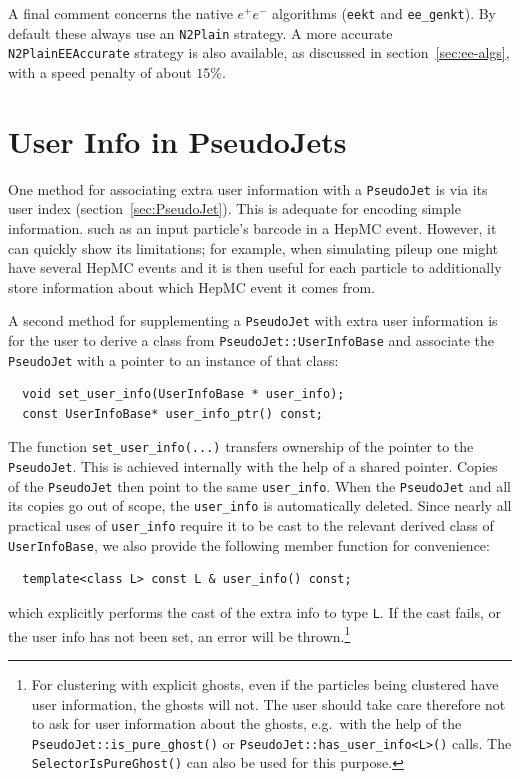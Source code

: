 \documentclass[12pt,a4]{article}
\newcommand{\ttt}[1]{{\small\texttt{#1}}}
\newcommand{\PJ}{\ttt{PseudoJet}\xspace}
\begin{document}
A final comment concerns the native $e^+e^-$ algorithms (\ttt{eekt}
and \ttt{ee\_genkt}).
%
By default these always use an \ttt{N2Plain} strategy.
%
A more accurate \ttt{N2PlainEEAccurate} strategy is also available, as
discussed in section~\ref{sec:ee-algs}, with a speed penalty of about
$15\%$.
 
\section{User Info in PseudoJets}
\label{app:user-info}

One method for associating extra user information with a
\ttt{PseudoJet} is via its user index
(section~\ref{sec:PseudoJet}). This is adequate for encoding simple
information. such as an input particle's barcode in a HepMC
event.
%
However, it can quickly show its limitations; for example, when
simulating pileup one might have several HepMC events and it is then
useful for each particle to additionally store information about which
HepMC event it comes from.

A second method for supplementing a \PJ with extra user information is for
the user to derive a class from \ttt{PseudoJet::UserInfoBase} and
associate the \ttt{PseudoJet} with a pointer to an instance of that
class:
\begin{lstlisting}
  void set_user_info(UserInfoBase * user_info);
  const UserInfoBase* user_info_ptr() const;
\end{lstlisting}
The function \ttt{set\_user\_info(...)} transfers ownership of the
pointer to the \ttt{PseudoJet}. 
%
This is achieved internally with the help of a shared pointer. Copies
of the \ttt{PseudoJet} then point to the same \ttt{user\_info}.
%
When the \ttt{PseudoJet} and all its copies go out of scope, the
\ttt{user\_info} is automatically deleted.
%
Since nearly all practical uses of \ttt{user\_info} require it
to be cast to the relevant derived class of  \ttt{UserInfoBase}, we also
provide the following member function for convenience:
\begin{lstlisting}
  template<class L> const L & user_info() const;
\end{lstlisting}
which explicitly performs the cast of the extra info to type \ttt{L}.
%
If the cast fails, or the user info has not been set, an error
will be thrown.\footnote{%
  For clustering with explicit ghosts, even if the particles being
  clustered have user information, the ghosts will not. 
  The user should take care therefore not to ask for user information
  about the ghosts, e.g.\ with the help of the \texttt{PseudoJet::is\_pure\_ghost()}
  or \texttt{PseudoJet::has\_user\_info<L>()} calls.
  The \texttt{SelectorIsPureGhost()} can also be used for this purpose.
}
\end{document}
